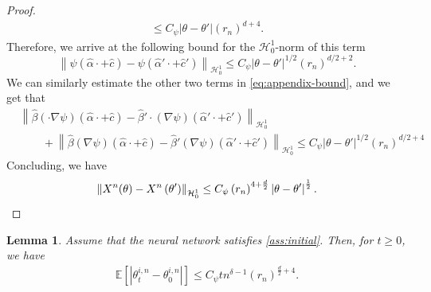 \documentclass[11pt,a4paper,reqno]{amsart}
\numberwithin{equation}{section}
\theoremstyle{plain}
\newtheorem{lemma}[theorem]{Lemma}
\theoremstyle{definition}
\newcommand{\E}{\mathbb{E}}
\newcommand{\cH}{\mathcal{H}}
\newcommand{\norm}[1]{\left\|#1 \right\|} %
\newcommand{\abs}[1]{\left|#1\right|} %
\begin{document}
\begin{proof}
\begin{multline*}
     \le  C_\psi \abs{\theta-\theta'}(r_n)^{d+4}.
\end{multline*}
Therefore, we arrive at the following bound for the $\cH_0^1$-norm of this term
\[
    \norm{\psi \left( \hat\alpha \cdot + \hat c \right)-\psi \left( \hat\alpha' \cdot + \hat c'\right)}_{\cH_0^1}\le C_\psi \abs{\theta-\theta'}^{1/2}(r_n)^{d/2+2}.
\]
We can similarly estimate the other two terms in \eqref{eq:appendix-bound}, and we get that
\begin{align*}
&\norm{\hat\beta  \left( \cdot\nabla \psi \right) \left( \hat\alpha \cdot + \hat c \right)-\hat\beta' \cdot \left( \nabla \psi \right) \left( \hat\alpha' \cdot + \hat c' \right)}_{\cH_0^1} \\
    &\qquad + \norm{\hat\beta \left( \nabla \psi \right) \left( \hat\alpha \cdot + \hat c \right)-\hat\beta' \left( \nabla \psi \right) \left( \hat\alpha' \cdot + \hat c' \right)}_{\cH_0^1} 
    \le  C_\psi \abs{\theta-\theta'}^{1/2}(r_n)^{d/2+4}
\end{align*}
Concluding, we have
\[
    \norm{X^n(\theta) - X^n\left( \theta'\right)}_{\cH_0^1} \le C_\psi \left(r_n\right)^{4+\frac{d}{2}}\abs{\theta-\theta'}^{\frac{1}{2}}. \qedhere
\]
\end{proof}

\begin{lemma}
\label{lem:thetat0}
Assume that the neural network satisfies \cref{ass:initial}.
Then, for $t\ge0$, we have
\begin{align*}
    \E\left[ \abs{\theta_t^{i, n} - \theta_0^{i, n}}\right] \le C_\psi tn^{\delta-1}\left(r_n\right)^{\frac{d}{2}+4}.
\end{align*} 
\end{lemma}
\end{document}
